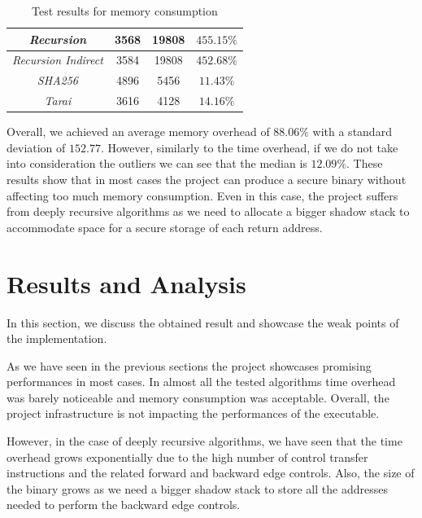 \begin{table}
\begin{tabular}{|c|c|c|c|}
    \hline
    \textit{Recursion}                   & 3568                         & 19808                        & $455.15\%$               \\
    \hline
    \textit{Recursion Indirect}          & 3584                         & 19808                        & $452.68\%$               \\
    \hline
    \textit{SHA256}                      & 4896                         & 5456                         & $11.43\%$                \\
    \hline
    \textit{Tarai}                       & 3616                         & 4128                         & $14.16\%$                \\
    \hline
  \end{tabular}
  \caption{Test results for memory consumption}
  \label{tab:binsize}
\end{table}

Overall, we achieved an average memory overhead of $88.06\%$ with a standard deviation
of $152.77$. However, similarly to the time overhead, if we do not take into
consideration the outliers we can see that the median is $12.09 \%$. These results
show that in most cases the project can produce a secure binary without affecting
too much memory consumption. Even in this case, the project suffers from deeply recursive
algorithms as we need to allocate a bigger shadow stack to accommodate space for
a secure storage of each return address.

\section{Results and Analysis}
\label{sec:pa_results}

In this section, we discuss the obtained result and showcase the weak points of the
implementation.

As we have seen in the previous sections the project showcases promising performances
in most cases. In almost all the tested algorithms time overhead was barely
noticeable and memory consumption was acceptable. Overall, the project
infrastructure is not impacting the performances of the executable.

However, in the case of deeply recursive algorithms, we have seen that the time
overhead grows exponentially due to the high number of control transfer
instructions and the related forward and backward edge controls. Also, the size
of the binary grows as we need a bigger shadow stack to store all the addresses
needed to perform the backward edge controls.

